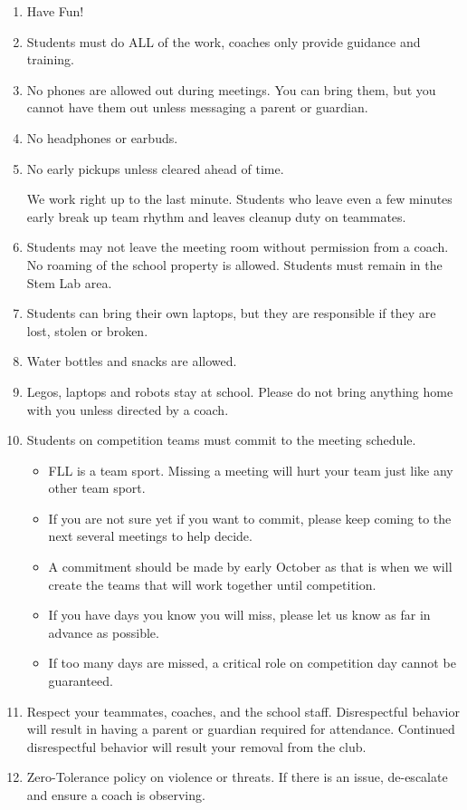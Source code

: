 \documentclass[letter]{article}
\begin{document}
\begin{enumerate}
  \item Have Fun!
  \item Students must do ALL of the work, coaches only provide guidance and training.
  \item No phones are allowed out during meetings.  You can bring them, but you cannot have them out unless messaging a parent or guardian.
  \item No headphones or earbuds.
  \item No early pickups unless cleared ahead of time.

      We work right up to the last minute.  Students who leave even a few minutes early break up team rhythm and leaves cleanup duty on teammates.

  \item Students may not leave the meeting room without permission from a coach.  No roaming of the school property is allowed.  Students must remain in the Stem Lab area.
  \item Students can bring their own laptops, but they are responsible if they are lost, stolen or broken.
  \item Water bottles and snacks are allowed.
  \item Legos, laptops and robots stay at school.  Please do not bring anything home with you unless directed by a coach.
  \item Students on competition teams must commit to the meeting schedule.

    \begin{itemize}
      \item FLL is a team sport. Missing a meeting will hurt your team just like any other team sport.
      \item If you are not sure yet if you want to commit, please keep coming to the next several meetings to help decide.
      \item A commitment should be made by early October as that is when we will create the teams that will work together until competition.
      \item If you have days you know you will miss, please let us know as far in advance as possible.
      \item If too many days are missed, a critical role on competition day cannot be guaranteed.
    \end{itemize}

  \item Respect your teammates, coaches, and the school staff.  Disrespectful behavior will result in having a parent or guardian required for attendance.  Continued disrespectful behavior will result your removal from the club.
  \item Zero-Tolerance policy on violence or threats.  If there is an issue, de-escalate and ensure a coach is observing.
\end{enumerate}
\end{document}
